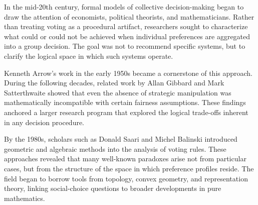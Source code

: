 \begin{historical}
In the mid-20th century, formal models of collective decision-making began to draw the attention of economists, political theorists, and mathematicians. Rather than treating voting as a procedural artifact, researchers sought to characterize what could or could not be achieved when individual preferences are aggregated into a group decision. The goal was not to recommend specific systems, but to clarify the logical space in which such systems operate.

Kenneth Arrow’s work in the early 1950s became a cornerstone of this approach. During the following decades, related work by Allan Gibbard and Mark Satterthwaite showed that even the absence of strategic manipulation was mathematically incompatible with certain fairness assumptions. These findings anchored a larger research program that explored the logical trade-offs inherent in any decision procedure.

By the 1980s, scholars such as Donald Saari and Michel Balinski introduced geometric and algebraic methods into the analysis of voting rules. These approaches revealed that many well-known paradoxes arise not from particular cases, but from the structure of the space in which preference profiles reside. The field began to borrow tools from topology, convex geometry, and representation theory, linking social-choice questions to broader developments in pure mathematics.
\end{historical}
